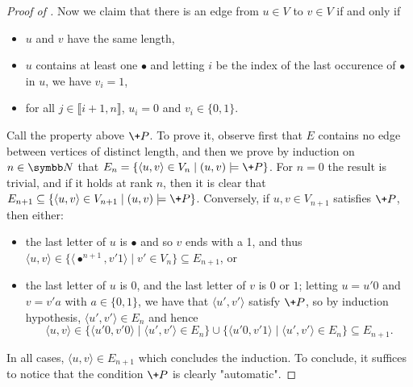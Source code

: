 \begin{proof}[Proof of ]
  Now we claim that there is an edge from $u \in V$ to $v \in V$ if and only if
  \begin{itemize}
    \item $u$ and $v$ have the same length,
    \item $u$ contains at least one $\bullet$
      and letting $i$ be the index of the last occurence of $\bullet$ in $u$,
      we have $v_i = 1$,
    \item for all $j \in \lBrack i+1,n\rBrack$, $u_i = 0$
    and $v_i \in \{0,1\}$.
  \end{itemize}
  Call the property above $\+P$.
  To prove it, observe first that $E$ contains no edge
  between vertices of distinct length, and then we prove
  by induction on $n\in\N$ that $E_n = \{\langle u,v\rangle \in V_n \mid (u,v) \models \+P\}$.
  For $n=0$ the result is trivial, and if it holds at rank $n$,
  then it is clear that $E_{n+1} \subseteq
  \{\langle u,v\rangle \in V_{n+1} \mid (u,v) \models \+P\}$.
  Conversely, if $u,v \in V_{n+1}$ satisfies $\+P$, then
  either:
  \begin{itemize}
    \item the last letter of $u$ is $\bullet$ and so $v$ ends with a
    1, and thus $\langle u,v \rangle \in \{\langle \bullet^{n+1}, v'1\rangle \mid v'\in V_n\}
    \subseteq E_{n+1}$, or 
    \item the last letter of $u$ is $0$, and the last letter of $v$ is $0$ or $1$;
      letting $u = u'0$ and $v = v'a$ with $a \in \{0,1\}$, we have
      that $\langle u', v'\rangle$ satisfy $\+P$, so by induction hypothesis,
      $\langle u', v'\rangle \in E_n$ and hence
      \[\langle u,v \rangle \in \{\langle u'0,v'0\rangle \mid \langle u',v'\rangle \in E_n\}
      \cup \{\langle u'0,v'1\rangle \mid \langle u',v'\rangle \in E_n\} \subseteq E_{n+1}.\]
  \end{itemize}
  In all cases, $\langle u,v\rangle \in E_{n+1}$ which concludes the induction.
  To conclude, it suffices to notice that the condition $\+P$ is clearly "automatic".
\end{proof}